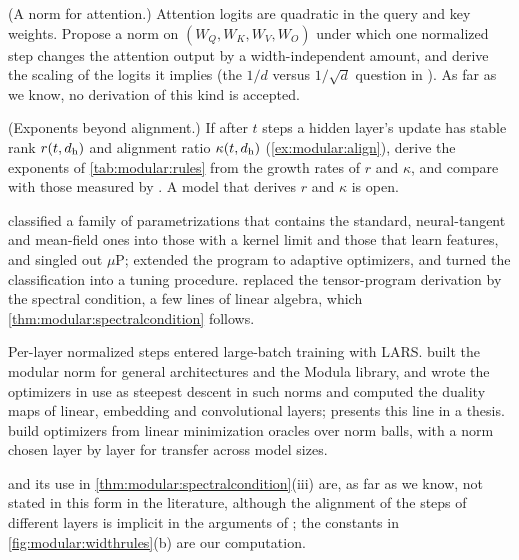 \begin{refsection}
\begin{exercises}
\item \research (A norm for attention.) Attention logits are quadratic in the query and key weights. Propose a norm on $(W_Q,W_K,W_V,W_O)$ under which one normalized step changes the attention output by a width-independent amount, and derive the scaling of the logits it implies (the $1/d$ versus $1/\sqrt d$ question in \textcite{Lingle2024}). As far as we know, no derivation of this kind is accepted.\label{ex:modular:attention}

\item \research (Exponents beyond alignment.) If after $t$ steps a hidden layer's update has stable rank $r(t,d_{\mathrm h})$ and alignment ratio $\kappa(t,d_{\mathrm h})$ (\cref{ex:modular:align}), derive the exponents of \cref{tab:modular:rules} from the growth rates of $r$ and $\kappa$, and compare with those measured by \textcite{EverettEtAl2024}. A model that derives $r$ and $\kappa$ is open.\label{ex:modular:research}
\end{exercises}

\notesandrefs
\Textcite{YangHu2021} classified a family of parametrizations that contains the standard, neural-tangent and mean-field ones into those with a kernel limit and those that learn features, and singled out $\mu$P; \textcite{YangLittwin2023} extended the program to adaptive optimizers, and \textcite{YangEtAl2021} turned the classification into a tuning procedure. \Textcite{YangSimonBernstein2023} replaced the tensor-program derivation by the spectral condition, a few lines of linear algebra, which \cref{thm:modular:spectralcondition} follows.

Per-layer normalized steps entered large-batch training with LARS. \Textcite{LargeEtAl2024} built the modular norm for general architectures and the Modula library, and \textcite{BernsteinNewhouse2024,BernsteinNewhouse2025} wrote the optimizers in use as steepest descent in such norms and computed the duality maps of linear, embedding and convolutional layers; \textcite{Newhouse2025} presents this line in a thesis. \Textcite{PethickEtAl2025} build optimizers from linear minimization oracles over norm balls, with a norm chosen layer by layer for transfer across model sizes.

 and its use in \cref{thm:modular:spectralcondition}(iii) are, as far as we know, not stated in this form in the literature, although the alignment of the steps of different layers is implicit in the arguments of \textcite{YangSimonBernstein2023}; the constants in \cref{fig:modular:widthrules}(b) are our computation.


\end{refsection}
